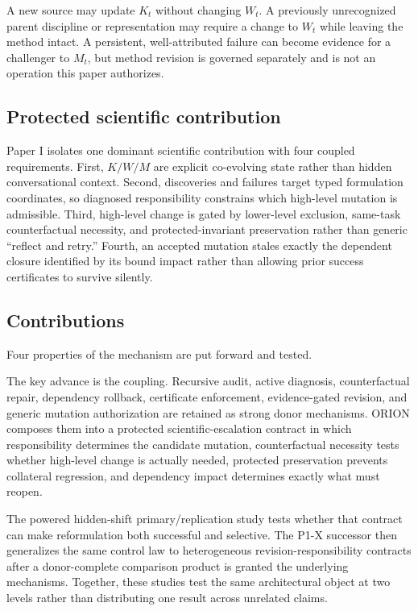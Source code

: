 A new source may update $K_t$ without changing $W_t$. A previously unrecognized parent discipline or representation may require a change to $W_t$ while leaving the method intact. A persistent, well-attributed failure can become evidence for a challenger to $M_t$, but method revision is governed separately and is not an operation this paper authorizes.

\subsection{Protected scientific contribution}

Paper I isolates one dominant scientific contribution with four coupled requirements. First, $K/W/M$ are explicit co-evolving state rather than hidden conversational context. Second, discoveries and failures target typed formulation coordinates, so diagnosed responsibility constrains which high-level mutation is admissible. Third, high-level change is gated by lower-level exclusion, same-task counterfactual necessity, and protected-invariant preservation rather than generic ``reflect and retry.'' Fourth, an accepted mutation stales exactly the dependent closure identified by its bound impact rather than allowing prior success certificates to survive silently.
\subsection{Contributions}

Four properties of the mechanism are put forward and tested.

The key advance is the coupling. Recursive audit, active diagnosis, counterfactual repair, dependency rollback, certificate enforcement, evidence-gated revision, and generic mutation authorization are retained as strong donor mechanisms. ORION composes them into a protected scientific-escalation contract in which responsibility determines the candidate mutation, counterfactual necessity tests whether high-level change is actually needed, protected preservation prevents collateral regression, and dependency impact determines exactly what must reopen.

The powered hidden-shift primary/replication study tests whether that contract can make reformulation both successful and selective. The P1-X successor then generalizes the same control law to heterogeneous revision-responsibility contracts after a donor-complete comparison product is granted the underlying mechanisms. Together, these studies test the same architectural object at two levels rather than distributing one result across unrelated claims.


